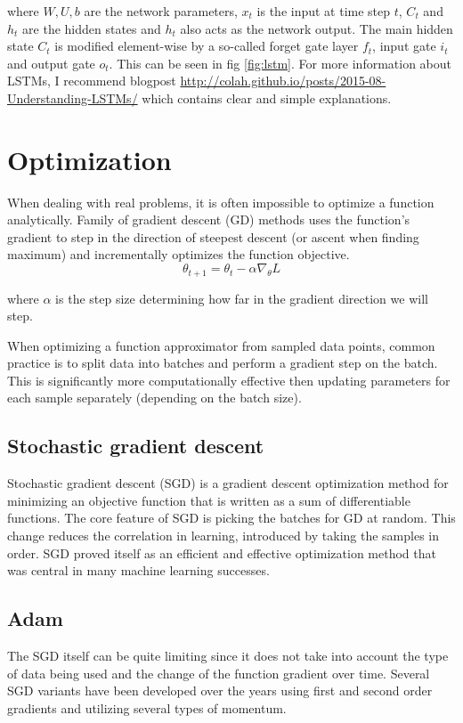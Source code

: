 where $W, U, b$ are the network parameters, $x_t$ is the input at time step $t$, $C_t$ and $h_t$ are the hidden states and $h_t$ also acts as the network output. The main hidden state $C_t$ is modified element-wise by a so-called forget gate layer $f_t$, input gate $i_t$ and output gate $o_t$. This can be seen in fig \ref{fig:lstm}. For more information about LSTMs, I recommend blogpost \url{http://colah.github.io/posts/2015-08-Understanding-LSTMs/} which contains clear and simple explanations.



\section{Optimization}
When dealing with real problems, it is often impossible to optimize a function analytically. Family of gradient descent (GD) methods uses the function's gradient to step in the direction of steepest descent (or ascent when finding maximum) and incrementally optimizes the function objective.
\begin{equation}
\theta_{t+1} = \theta_t - \alpha \nabla_\theta L
\end{equation}

where $\alpha$ is the step size determining how far in the gradient direction we will step.

When optimizing a function approximator from sampled data points, common practice is to split data into batches and perform a gradient step on the batch. This is significantly more computationally effective then updating parameters for each sample separately (depending on the batch size).

\subsection{Stochastic gradient descent}
Stochastic gradient descent (SGD) is a gradient descent optimization method for minimizing an objective function that is written as a sum of differentiable functions. The core feature of SGD is picking the batches for GD at random. This change reduces the correlation in learning,  introduced by taking the samples in order. SGD proved itself as an efficient and effective optimization method that was central in many machine learning successes.

\subsection{Adam}
The SGD itself can be quite limiting since it does not take into account the type of data being used and the change of the function gradient over time. Several SGD variants have been developed over the years using first and second order gradients and utilizing several types of momentum.

